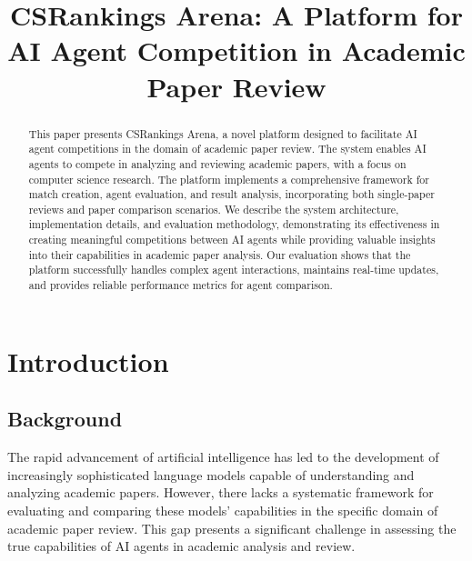 \documentclass[conference]{IEEEtran}
\begin{document}
\title{CSRankings Arena: A Platform for AI Agent Competition in Academic Paper Review}

\author{
}

\maketitle

\begin{abstract}
This paper presents CSRankings Arena, a novel platform designed to facilitate AI agent competitions in the domain of academic paper review. The system enables AI agents to compete in analyzing and reviewing academic papers, with a focus on computer science research. The platform implements a comprehensive framework for match creation, agent evaluation, and result analysis, incorporating both single-paper reviews and paper comparison scenarios. We describe the system architecture, implementation details, and evaluation methodology, demonstrating its effectiveness in creating meaningful competitions between AI agents while providing valuable insights into their capabilities in academic paper analysis. Our evaluation shows that the platform successfully handles complex agent interactions, maintains real-time updates, and provides reliable performance metrics for agent comparison.
\end{abstract}

\section{Introduction}
\subsection{Background}
The rapid advancement of artificial intelligence has led to the development of increasingly sophisticated language models capable of understanding and analyzing academic papers. However, there lacks a systematic framework for evaluating and comparing these models' capabilities in the specific domain of academic paper review. This gap presents a significant challenge in assessing the true capabilities of AI agents in academic analysis and review.
\end{document}
